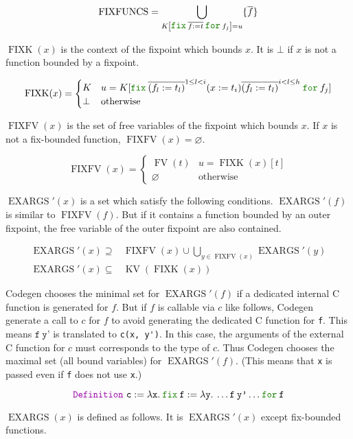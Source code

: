 \documentclass[a4paper,fleqn]{article}
\def\codegen{\textrm{Codegen}}
\newcommand{\kwDefinition}{\mbox{\color{myviolet}\ttfamily Definition}}
\newcommand{\kwfix}{\mbox{\color{mygreen}\ttfamily fix}}
\newcommand{\kwfor}{\mbox{\color{mygreen}\ttfamily for}}
\newcommand{\lam}[2]{\lambda #1.\:#2}
\newcommand{\ofix}[2]{\kwfix\:{#1}\:\kwfor\:{#2}}
\DeclareMathOperator{\FV}{FV}
\DeclareMathOperator{\KV}{KV}
\DeclareMathOperator{\FIXFUNCS}{FIXFUNCS}
\DeclareMathOperator{\FIXK}{FIXK}
\DeclareMathOperator{\FIXFV}{FIXFV}
\DeclareMathOperator{\EXARGS}{EXARGS}
\newcommand{\rep}[1]{\overline{#1}}
\newcommand{\repi}[2]{\overline{#1}^{#2}}
\begin{document}
\[
  \FIXFUNCS = \bigcup_{K\left[\ofix{\rep{f:=t}}{f_j}\right] = u} \{\rep{f}\}
\]

$\FIXK(x)$ is the context of the fixpoint which bounds $x$.
It is $\bot$ if $x$ is not a function bounded by a fixpoint.

\[
  \FIXK(x) =
  \begin{cases}
    K & u = K[\ofix{\repi{(f_l:=t_l)}{1\leq l < i} (x:=t_i) \repi{(f_l:=t_l)}{i < l \leq h}}{f_j}]  \\
    \bot & \text{otherwise}
  \end{cases}
\]

$\FIXFV(x)$ is the set of free variables of the fixpoint which bounds $x$.
If $x$ is not a fix-bounded function, $\FIXFV(x)=\varnothing$.

\[
  \FIXFV(x) =
  \begin{cases}
    \FV(t) & u = \FIXK(x)[t]  \\
    \varnothing & \text{otherwise}
  \end{cases}
\]

$\EXARGS'(x)$ is a set which satisfy the following conditions.
$\EXARGS'(f)$ is similar to $\FIXFV(f)$.
But if it contains a function bounded by an outer fixpoint, the free variable of the outer fixpoint are also contained.

\begin{align*}
  \EXARGS'(x) \supseteq& \FIXFV(x) \cup \bigcup_{y \in \FIXFV(x)} \EXARGS'(y) \\
  \EXARGS'(x) \subseteq& \KV(\FIXK(x))
\end{align*}

\codegen{} chooses the minimal set for $\EXARGS'(f)$ if a dedicated internal C function is generated for $f$.
But if $f$ is callable via $c$ like follows, \codegen{} generate a call to $c$ for $f$
to avoid generating the dedicated C function for \texttt{f}.
This means $\texttt{f}\:\texttt{y'}$ is translated to \lstinline[style=Cstyle]!c(x, y')!.
In this case, the arguments of the external C function for $c$ must corresponds to the type of $c$.
Thus \codegen{} chooses the maximal set (all bound variables) for $\EXARGS'(f)$.
(This means that \texttt{x} is passed even if \texttt{f} does not use \texttt{x}.)

\[
  \kwDefinition~\texttt{c} := \lam{\texttt{x}}{\ofix{\texttt{f}:=\lam{\texttt{y}}{\ldots \texttt{f}\:\texttt{y'} \ldots}}{\texttt{f}}}
\]

$\EXARGS(x)$ is defined as follows.
It is $\EXARGS'(x)$ except fix-bounded functions.
\end{document}
